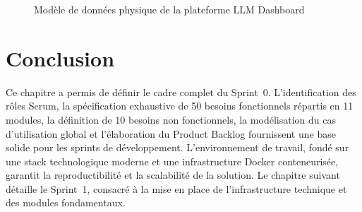 \begin{figure}[H]
    \centering
    \caption{Modèle de données physique de la plateforme LLM Dashboard}
    \label{fig:er_database}
\end{figure}



\section*{Conclusion}

Ce chapitre a permis de définir le cadre complet du Sprint~0. L'identification des rôles Scrum, la spécification exhaustive de 50 besoins fonctionnels répartis en 11 modules, la définition de 10 besoins non fonctionnels, la modélisation du cas d'utilisation global et l'élaboration du Product Backlog fournissent une base solide pour les sprints de développement. L'environnement de travail, fondé sur une stack technologique moderne et une infrastructure Docker conteneurisée, garantit la reproductibilité et la scalabilité de la solution. Le chapitre suivant détaille le Sprint~1, consacré à la mise en place de l'infrastructure technique et des modules fondamentaux.
